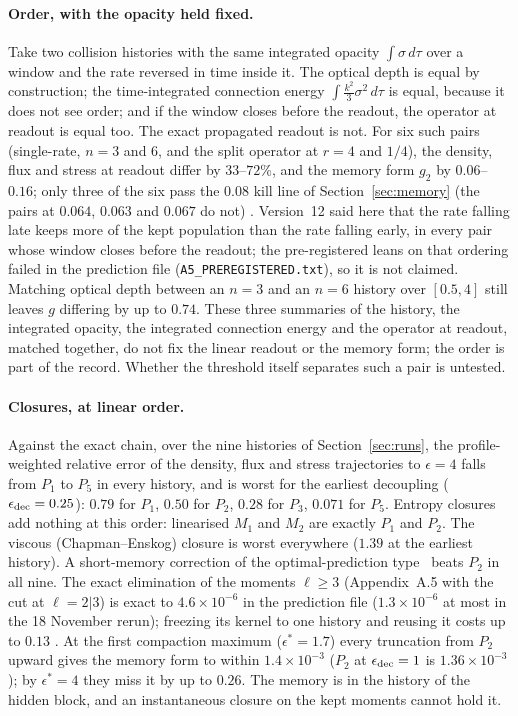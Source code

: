 \paragraph{Order, with the opacity held fixed.} Take two collision histories with the same integrated opacity $\int\sigma\,d\tau$ over a window and the rate reversed in time inside it. The optical depth is equal by construction; the time-integrated connection energy $\int\tfrac{k^2}{3}\sigma^2\,d\tau$ is equal, because it does not see order; and if the window closes before the readout, the operator at readout is equal too. The exact propagated readout is not. For six such pairs (single-rate, $n=3$ and $6$, and the split operator at $r=4$ and $1/4$), the density, flux and stress at readout differ by $33$--$72\%$, and the memory form $g_2$ by $0.06$--$0.16$; only three of the six pass the $0.08$ kill line of Section~\ref{sec:memory} (the pairs at $0.064$, $0.063$ and $0.067$ do not) . Version~12 said here that the rate falling late keeps more of the kept population than the rate falling early, in every pair whose window closes before the readout; the pre-registered leans on that ordering failed in the prediction file (\texttt{A5\_PREREGISTERED.txt}), so it is not claimed. Matching optical depth between an $n=3$ and an $n=6$ history over $[0.5,4]$ still leaves $g$ differing by up to $0.74$. These three summaries of the history, the integrated opacity, the integrated connection energy and the operator at readout, matched together, do not fix the linear readout or the memory form; the order is part of the record. Whether the threshold itself separates such a pair is untested.

\paragraph{Closures, at linear order.} Against the exact chain, over the nine histories of Section~\ref{sec:runs}, the profile-weighted relative error of the density, flux and stress trajectories to $\epsilon=4$ falls from $P_1$ to $P_5$ in every history, and is worst for the earliest decoupling ($\epsilon_{\rm dec}=0.25$): $0.79$ for $P_1$, $0.50$ for $P_2$, $0.28$ for $P_3$, $0.071$ for $P_5$. Entropy closures add nothing at this order: linearised $M_1$ and $M_2$ are exactly $P_1$ and $P_2$. The viscous (Chapman--Enskog) closure is worst everywhere ($1.39$ at the earliest history). A short-memory correction of the optimal-prediction type~\cite{SF} beats $P_2$ in all nine. The exact elimination of the moments $\ell\ge3$ (Appendix~A.5 with the cut at $\ell=2|3$) is exact to $4.6\times10^{-6}$ in the prediction file ($1.3\times10^{-6}$ at most in the 18 November rerun); freezing its kernel to one history and reusing it costs up to $0.13$ . At the first compaction maximum ($\epsilon^\ast=1.7$) every truncation from $P_2$ upward gives the memory form to within $1.4\times10^{-3}$ ($P_2$ at $\epsilon_{\rm dec}=1$ is $1.36\times10^{-3}$); by $\epsilon^\ast=4$ they miss it by up to $0.26$. The memory is in the history of the hidden block, and an instantaneous closure on the kept moments cannot hold it.

